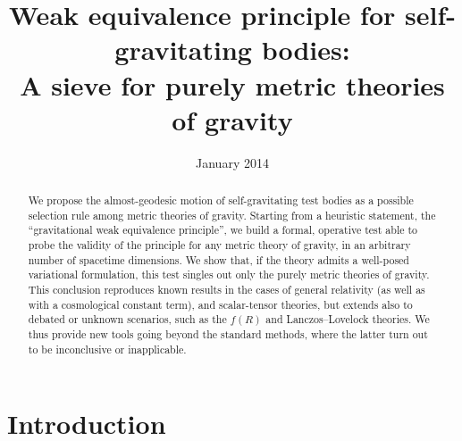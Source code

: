 \documentclass[a4paper,showkeys,aps,prd,reprint,nofootinbib,showpacs,twocolumn]{revtex4-1}
\theoremstyle{plain}
\begin{document}
\title{Weak equivalence principle for self-gravitating bodies: \\
A sieve for purely metric theories of gravity}

\date{January 2014}

\author{ }
%
\author{ }
%
%
\author{ }
%


\begin{abstract}
We propose the almost-geodesic motion of self-gravitating test bodies as a possible selection rule among metric theories of gravity.  Starting from a heuristic statement, the ``gravitational weak equivalence principle'', we build a formal, operative test able to probe the validity of the principle for any metric theory of gravity, in an arbitrary number of spacetime dimensions.  We show that, if the theory admits a well-posed variational formulation, this test singles out only the purely metric theories of gravity.  This conclusion reproduces known results in the cases of general relativity (as well as with a cosmological constant term), and scalar-tensor theories, but extends also to debated or unknown scenarios, such as the $f (R)$ and Lanczos--Lovelock theories.  We thus provide new tools going beyond the standard methods, where the latter turn out to be inconclusive or inapplicable.
\end{abstract}

%

\maketitle


\section{Introduction}
\label{S:1}
\end{document}
